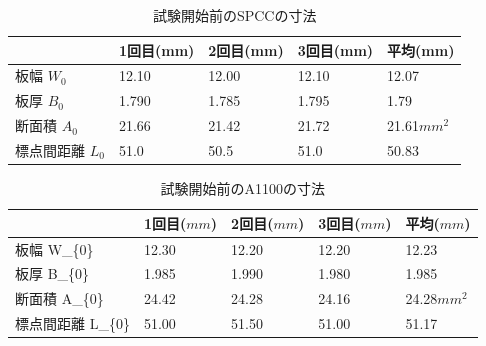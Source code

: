 \documentclass[10pt,a4j]{jsarticle}
\begin{document}
    \begin{table}[H]
      \centering
      \caption{試験開始前のSPCCの寸法}
      \label{my-label}
        \footnotesize
        \begin{tabular}{lllll}
                      & 1回目(mm) & 2回目(mm) & 3回目(mm) & 平均(mm) \\ \hline
        板幅 $W_{0}$    & 12.10   & 12.00   & 12.10   & 12.07  \\
        板厚 $B_{0}$    & 1.790   & 1.785   & 1.795   & 1.79   \\
        断面積 $A_{0}$   & 21.66   & 21.42   & 21.72   & 21.61$mm^{2}$  \\
        標点間距離 $L_{0}$ & 51.0    & 50.5    & 51.0    & 50.83 
      \end{tabular}
    \end{table}
    \begin{table}[H]
      \centering
      \caption{試験開始前のA1100の寸法}
      \label{my-label}
      \footnotesize
      \begin{tabular}{lllll}
                      & 1回目($mm$) & 2回目($mm$) & 3回目($mm$) & 平均($mm$) \\ \hline
        板幅 W\_\{0\}    & 12.30   & 12.20   & 12.20   & 12.23  \\
        板厚 B\_\{0\}    & 1.985   & 1.990   & 1.980   & 1.985  \\
        断面積 A\_\{0\}   & 24.42   & 24.28   & 24.16   & 24.28$mm^{2}$  \\
        標点間距離 L\_\{0\} & 51.00   & 51.50   & 51.00   & 51.17 
      \end{tabular}
    \end{table}
\end{document}
